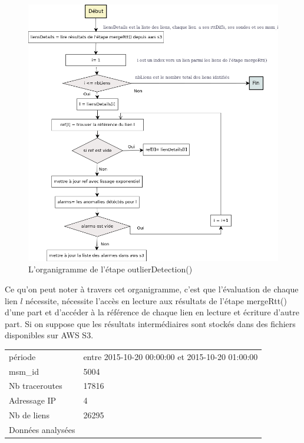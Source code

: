  \begin{figure}
\centering
\includegraphics[width=1\linewidth]{illustrations/outlier_detection_organigramm}
\caption{L'organigramme de  l'étape outlierDetection()}
\label{fig:outlier_detection_organigramm}
\end{figure}

Ce qu'on peut noter à travers cet organigramme, c'est que l'évaluation de chaque lien $l$ nécessite, nécessite l'accès en lecture aux résultats de l'étape mergeRtt()  d'une part et d'accéder à la référence de chaque lien  en lecture et écriture d'autre part. Si on suppose que les résultats intermédiaires sont stockés dans des fichiers disponibles sur AWS S3.

\begin{table}
	\begin{tabular}{ll}
période & entre 2015-10-20 00:00:00 et 2015-10-20 01:00:00\\ 
msm_id &  5004\\
Nb traceroutes &  17816\\
Adressage IP & 4 \\
Nb de liens &26295\\
Données analysées & \\ 
	\end{tabular}
\end{table}

